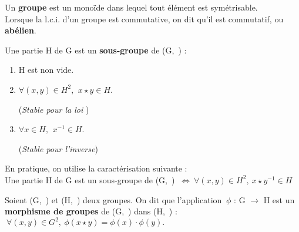 \vspace{1.4cm}

Un \textbf{groupe} est un monoïde dans lequel tout élément est symétrisable.\vspace{0.1cm} \\
Lorsque la l.c.i. d'un groupe est commutative, on dit qu'il est commutatif, ou \textbf{abélien}.

\vspace{1cm}

\noindent Une partie H de G est un \textbf{sous-groupe} de (G,\ \lci) \ssi :\vspace{-0.1cm}
\begin{enumerate}[leftmargin=2cm]
    \item H est non vide.\vspace{0.1cm}

    \item \(\forall(x,y)\in H^2,\ \, x\star y\in H \). \hspace{0.3cm}
    \begin{small}
        (\emph{Stable pour la loi \lci})
    \end{small}\vspace{0.1cm}

    \item \(\forall x\in H,\ \,x^{-1}\in H \). \hspace{1.4cm}
    \begin{small}
        (\emph{Stable pour l'inverse})
    \end{small}
\end{enumerate}

\vspace{0.3cm}
\begin{small}
\noindent En pratique, on utilise la caractérisation suivante : \vspace{0.1cm} \\
Une partie H de G est un sous-groupe de (G,\ \lci) \(\ \Leftrightarrow \ \forall (x,y)\in H^2,\ x\star y^{-1}\in H\)
\end{small}

\vspace{1cm}

Soient (G,\ \lci) et (H,\ \lce) deux groupes. On dit que l'application \(\ \phi\) : G \(\to\) H est un \textbf{morphisme de groupes} de (G,\ \lci) dans (H,\ \lce) \ssi : \(\ \forall(x,y)\in G^2,\ \phi(x\star y)=\phi(x)\cdot \phi(y). \)

\vspace{0.1cm}

